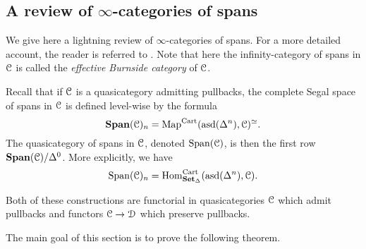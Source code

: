 \documentclass[main.tex]{subfiles}
\begin{document}
\subsection{A review of \texorpdfstring{$\infty$}{infinity}-categories of spans}
\label{ssc:a_review_of_infinity_categories_of_spans}

We give here a lightning review of $\infty$-categories of spans. For a more detailed account, the reader is referred to \cite[Sec.\ 3]{spectralmackeyfunctors1}. Note that here the infinity-category of spans in $\mathcal{C}$ is called the \emph{effective Burnside category} of $\mathcal{C}$.

Recall that if $\mathcal{C}$ is a quasicategory admitting pullbacks, the complete Segal space of spans in $\mathcal{C}$ is defined level-wise by the formula
\begin{equation*}
  \mathbf{Span}(\mathcal{C})_{n} = \mathrm{Map}^{\mathrm{Cart}}(\mathrm{asd}(\Delta^{n}), \mathcal{C})^{\simeq}.
\end{equation*}
The quasicategory of spans in $\mathcal{C}$, denoted $\mathrm{Span}(\mathcal{C})$, is then the first row $\mathbf{Span}(\mathcal{C}) / \Delta^{0}$. More explicitly, we have
\begin{equation*}
  \mathrm{Span}(\mathcal{C})_{n} = \mathrm{Hom}_{\mathbf{Set}_{\Delta}}^{\mathrm{Cart}}(\mathrm{asd}(\Delta^{n}), \mathcal{C}).
\end{equation*}

Both of these constructions are functorial in quasicategories $\mathcal{C}$ which admit pullbacks and functors $\mathcal{C} \to \mathcal{D}$ which preserve pullbacks.

The main goal of this section is to prove the following theorem.
\end{document}
